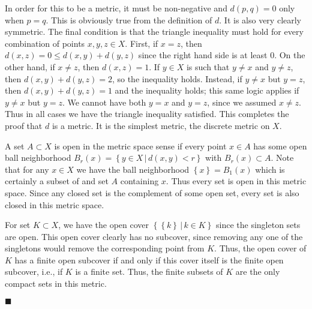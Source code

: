 \documentclass[12pt]{article}
\renewcommand{\qed}{\hfill$\blacksquare$}
\renewenvironment{proof}{\begin{addmargin}[1em]{0em}\begin{newproof}}{\end{newproof}\end{addmargin}\qed}
\begin{document}
\begin{proof}
In order for this to be a metric, it must be non-negative and $d\left(p,q\right) = 0$ only when $p=q$. This is obviously true from the definition of $d$. It is also very clearly symmetric. The final condition is that the triangle inequality must hold for every combination of points $x,y,z \in X$. First, if $x=z$, then $d\left(x,z\right) =0 \leq d\left(x,y\right) + d\left(y,z\right)$ since the right hand side is at least $0$. On the other hand, if $x\neq z$, then $d\left(x,z\right)=1$. If $y\in X$ is such that $y\neq x$ and $y\neq z$, then $d\left(x,y\right) + d\left(y,z\right) = 2$, so the inequality holds. Instead, if $y\neq x$ but $y=z$, then $d\left(x,y\right) + d\left(y,z\right) = 1$ and the inequality holds; this same logic applies if $y\neq x$ but $y=z$. We cannot have both $y=x$ and $y=z$, since we assumed $x\neq z$. Thus in all cases we have the triangle inequality satisfied. This completes the proof that $d$ is a metric. {\color{red}It is the simplest metric, the discrete metric on $X$.}

A set $A\subset X$ is open {\color{red}in the metric space sense} if every point $x\in A$ has some open ball neighborhood $B_r\left(x\right) = \left\{ y\in X\,|\, d\left(x,y\right)<r\right\}$ with $B_r\left(x\right) \subset A$. Note that for any $x\in X$ we have the ball neighborhood $\left\{x\right\} = B_1\left(x\right)$ which is certainly a subset of and set $A$ containing $x$. Thus every set is open in this metric space. Since any closed set is the complement of some open set, every set is also closed in this metric space.

For set $K \subset X$, we have the open cover $\left\{ \left\{k\right\}\, | \, k \in K\right\}$ since the singleton sets are open. This open cover clearly has {\color{red}no subcover}, since removing any one of the singletons would remove the corresponding point from $K$. Thus, the open cover of $K$ has a finite open subcover if and only if this cover itself is the finite open subcover, i.e., if $K$ is a finite set. Thus, the finite subsets of $K$ are the only compact sets in this metric.
\end{proof}
\end{document}
